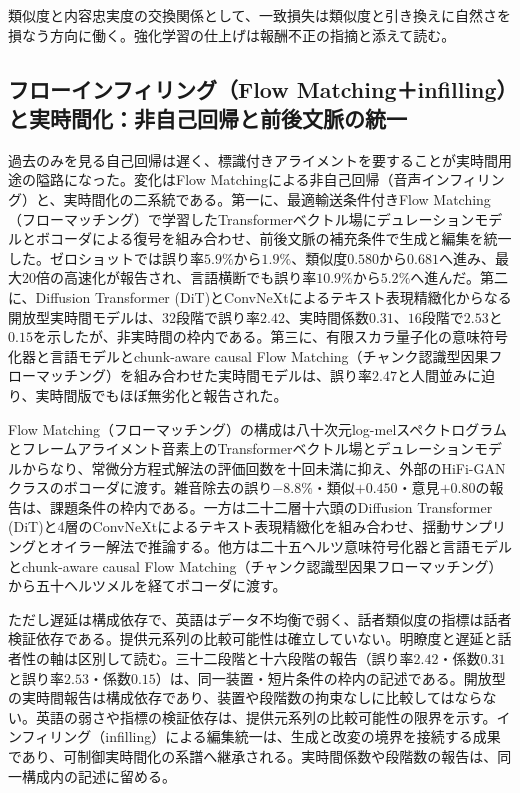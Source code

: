 \documentclass[lualatex,a4paper,10pt]{jlreq}
\begin{document}
類似度と内容忠実度の交換関係として、一致損失は類似度と引き換えに自然さを損なう方向に働く\autocite{btd057}。強化学習の仕上げは報酬不正の指摘と添えて読む\autocite{btd061}。

\subsection{フローインフィリング（Flow Matching＋infilling）と実時間化：非自己回帰と前後文脈の統一}
過去のみを見る自己回帰は遅く、標識付きアライメントを要することが実時間用途の隘路になった\autocite{btd060}。変化はFlow Matchingによる非自己回帰（音声インフィリング）と、実時間化の二系統である\autocite{btd060,btd132,btd133}。第一に、最適輸送条件付きFlow Matching（フローマッチング）で学習したTransformerベクトル場にデュレーションモデルとボコーダによる復号を組み合わせ、前後文脈の補充条件で生成と編集を統一した\autocite{btd060}。ゼロショットでは誤り率$5.9\%$から$1.9\%$、類似度$0.580$から$0.681$へ進み、最大$20$倍の高速化が報告され、言語横断でも誤り率$10.9\%$から$5.2\%$へ進んだ\autocite{btd060}。第二に、Diffusion Transformer (DiT)とConvNeXtによるテキスト表現精緻化からなる開放型実時間モデルは、$32$段階で誤り率$2.42$、実時間係数$0.31$、$16$段階で$2.53$と$0.15$を示したが、非実時間の枠内である\autocite{btd132}。第三に、有限スカラ量子化の意味符号化器と言語モデルとchunk-aware causal Flow Matching（チャンク認識型因果フローマッチング）を組み合わせた実時間モデルは、誤り率$2.47$と人間並みに迫り、実時間版でもほぼ無劣化と報告された\autocite{btd133}。

Flow Matching（フローマッチング）の構成は八十次元log-melスペクトログラムとフレームアライメント音素上のTransformerベクトル場とデュレーションモデルからなり、常微分方程式解法の評価回数を十回未満に抑え、外部のHiFi-GANクラスのボコーダに渡す\autocite{btd060}。雑音除去の誤り$-8.8\%$・類似$+0.450$・意見$+0.80$の報告は、課題条件の枠内である\autocite{btd060}。一方は二十二層十六頭のDiffusion Transformer (DiT)と4層のConvNeXtによるテキスト表現精緻化を組み合わせ、揺動サンプリングとオイラー解法で推論する\autocite{btd132}。他方は二十五ヘルツ意味符号化器と言語モデルとchunk-aware causal Flow Matching（チャンク認識型因果フローマッチング）から五十ヘルツメルを経てボコーダに渡す\autocite{btd133}。

ただし遅延は構成依存で、英語はデータ不均衡で弱く、話者類似度の指標は話者検証依存である\autocite{btd132,btd133}。提供元系列の比較可能性は確立していない\autocite{btd132,btd133}。明瞭度と遅延と話者性の軸は区別して読む\autocite{btd060,btd132,btd133}。三十二段階と十六段階の報告（誤り率$2.42$・係数$0.31$と誤り率$2.53$・係数$0.15$）は、同一装置・短片条件の枠内の記述である\autocite{btd132}。開放型の実時間報告は構成依存であり、装置や段階数の拘束なしに比較してはならない\autocite{btd132}。英語の弱さや指標の検証依存は、提供元系列の比較可能性の限界を示す\autocite{btd132,btd133}。インフィリング（infilling）による編集統一は、生成と改変の境界を接続する成果であり、可制御実時間化の系譜へ継承される\autocite{btd060}。実時間係数や段階数の報告は、同一構成内の記述に留める\autocite{btd132,btd133}。
\end{document}
